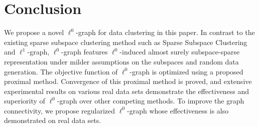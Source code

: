 \documentclass[10pt,twocolumn,letterpaper]{article}
\begin{document}
\section{Conclusion}
We propose a novel $\ell^{0}$-graph for data clustering in this paper. In contrast to the existing sparse subspace clustering method such as Sparse Subspace Clustering and $\ell^{1}$-graph, $\ell^{0}$-graph features $\ell^{0}$-induced almost surely subspace-sparse representation under milder assumptions on the subspaces and random data generation. The objective function of $\ell^{0}$-graph is optimized using a proposed proximal method. Convergence of this proximal method is proved, and extensive experimental results on various real data sets demonstrate the effectiveness and superiority of $\ell^{0}$-graph over other competing methods. To improve the graph connectivity, we propose regularized $\ell^{0}$-graph whose effectiveness is also demonstrated on real data sets.


{\small


}
\end{document}

